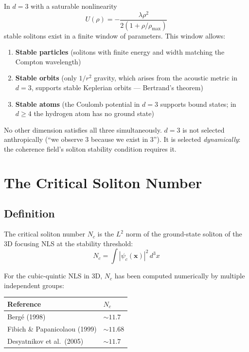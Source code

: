 \documentclass[11pt, a4paper]{article}
\begin{document}
In $d = 3$ with a saturable nonlinearity
\begin{equation}
  U(\rho) = -\frac{\lambda\rho^2}{2(1 + \rho/\rho_{\max})}
\end{equation}
stable solitons exist in a finite window of parameters. This
window allows:
\begin{enumerate}[nosep]
  \item \textbf{Stable particles} (solitons with finite energy
        and width matching the Compton wavelength)
  \item \textbf{Stable orbits} (only $1/r^2$ gravity, which
        arises from the acoustic metric in $d = 3$, supports
        stable Keplerian orbits --- Bertrand's theorem)
  \item \textbf{Stable atoms} (the Coulomb potential in $d = 3$
        supports bound states; in $d \geq 4$ the hydrogen atom
        has no ground state)
\end{enumerate}

No other dimension satisfies all three simultaneously.
$d = 3$ is not selected anthropically (``we observe 3 because
we exist in 3''). It is selected \emph{dynamically}: the
coherence field's soliton stability condition requires it.

\section{The Critical Soliton Number}

\subsection{Definition}

The critical soliton number $N_c$ is the $L^2$ norm of the
ground-state soliton of the 3D focusing NLS at the stability
threshold:
\begin{equation}
  N_c = \int |\psi_c(\mathbf{x})|^2\, d^3x
\end{equation}

For the cubic-quintic NLS in 3D, $N_c$ has been computed
numerically by multiple independent groups:
\begin{center}
\begin{tabular}{@{}ll@{}}
\toprule
\textbf{Reference} & $N_c$ \\
\midrule
Berg\'e (1998) & $\sim 11.7$ \\
Fibich \& Papanicolaou (1999) & $\sim 11.68$ \\
Desyatnikov et al.\ (2005) & $\sim 11.7$ \\
\bottomrule
\end{tabular}
\end{center}
\end{document}
